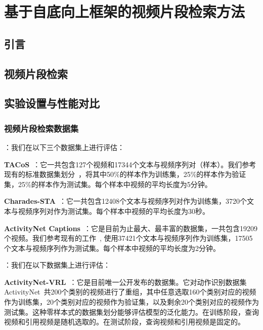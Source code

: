 \chapter{基于自底向上框架的视频片段检索方法}

\section{引言}

\section{视频片段检索}

\section{实验设置与性能对比}

\subsection{视频片段检索数据集}

\noindent\textbf{}：我们在以下三个数据集上进行评估：

\noindent\textbf{TACoS}~\cite{regneri2013grounding}：它一共包含127个视频和17344个文本与视频序列对（样本）。我们参考现有的标准数据集划分~\cite{gao2017tall}，将其中50\%的样本作为训练集，25\%的样本作为验证集，25\%的样本作为测试集。每个样本中视频的平均长度为5分钟。


\noindent\textbf{Charades-STA}~\cite{gao2017tall}：它一共包含12408个文本与视频序列对作为训练集，3720个文本与视频序列对作为测试集。每个样本中视频的平均长度为30秒。


\noindent\textbf{ActivityNet Captions}~\cite{krishna2017dense}：它是目前为止最大、最丰富的数据集，一共包含19209个视频。我们参考现有的工作~\cite{yuan2019find}, 使用37421个文本与视频序列作为训练集，17505个文本与视频序列作为测试集。每个样本中视频的平均长度为2分钟。


\noindent\textbf{}：我们在以下数据集上进行评估：

\noindent\textbf{ActivityNet-VRL}~\cite{feng2018video}：它是目前唯一公开发布的数据集。它对动作识别数据集ActivityNet~\cite{caba2015activitynet}共200个类别的视频进行了重组，其中任意选取160个类别对应的视频作为训练集，20个类别对应的视频作为验证集，以及剩余20个类别对应的视频作为测试集。这种零样本式的数据集划分能够评估模型的泛化能力。在训练阶段，查询视频和引用视频是随机选取的。在测试阶段，查询视频和引用视频是固定的。

